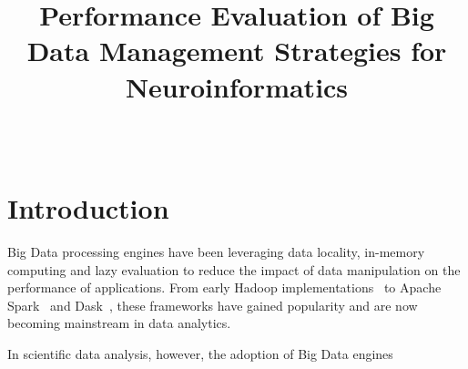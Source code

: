 \documentclass{IEEEtran}
\begin{document}
\title{Performance Evaluation of Big Data Management Strategies for Neuroinformatics}

\author{
  \\
}

\maketitle

%
%
\begin{abstract}
  
\end{abstract}

%
%
\section{Introduction} %

Big Data processing engines have been leveraging data locality, 
in-memory computing and lazy evaluation to reduce the impact of data 
manipulation on the performance of applications. From early Hadoop 
implementations~\cite{hadoop} to Apache Spark~\cite{spark} and 
Dask~\cite{dask}, these frameworks have gained popularity and are now 
becoming mainstream in data analytics.

In scientific data analysis, however, the adoption of Big Data engines 


\end{document}
